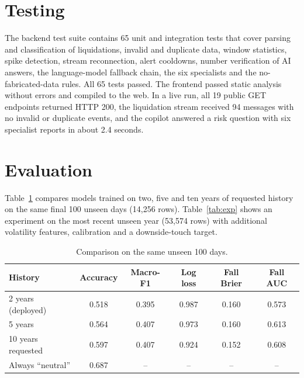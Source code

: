 \documentclass[11pt,a4paper]{article}
\begin{document}
\section{Testing}
The backend test suite contains 65 unit and integration tests that cover parsing and classification of liquidations, invalid and duplicate data, window statistics, spike detection, stream reconnection, alert cooldowns, number verification of AI answers, the language-model fallback chain, the six specialists and the no-fabricated-data rules. All 65 tests passed. The frontend passed static analysis without errors and compiled to the web. In a live run, all 19 public GET endpoints returned HTTP 200, the liquidation stream received 94 messages with no invalid or duplicate events, and the copilot answered a risk question with six specialist reports in about 2.4 seconds.

\section{Evaluation}
Table~\ref{tab:history} compares models trained on two, five and ten years of requested history on the same final 100 unseen days (14{,}256 rows). Table~\ref{tab:exp} shows an experiment on the most recent unseen year (53{,}574 rows) with additional volatility features, calibration and a downside-touch target.

\begin{table}[H]\centering\small
\caption{Comparison on the same unseen 100 days.}\label{tab:history}
\begin{tabular}{lccccc}\toprule
History & Accuracy & Macro-F1 & Log loss & Fall Brier & Fall AUC\\\midrule
2 years (deployed) & 0.518 & 0.395 & 0.987 & 0.160 & 0.573\\
5 years & 0.564 & 0.407 & 0.973 & 0.160 & 0.613\\
10 years requested & 0.597 & 0.407 & 0.924 & 0.152 & 0.608\\
Always ``neutral'' & 0.687 & -- & -- & -- & --\\\bottomrule
\end{tabular}\end{table}
\end{document}
